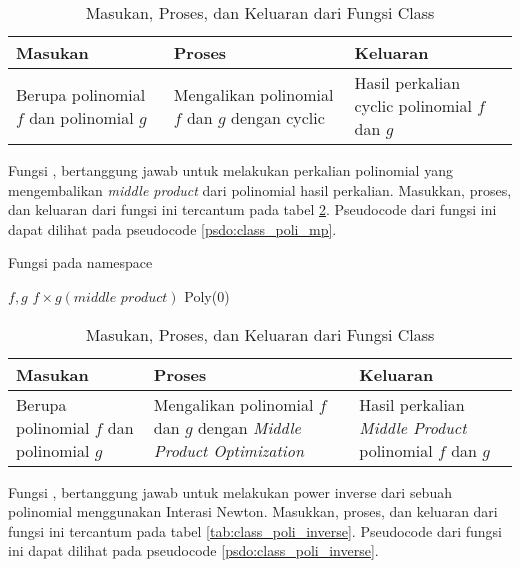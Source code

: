 \begin{table}[]	
	\Centering
	\begin{tabular}{|p{3cm}|p{3cm}|p{3cm}|}
	\hline
	Masukan & Proses & Keluaran \\ \hline
	Berupa polinomial $f$ dan polinomial $g$ & Mengalikan polinomial $f$ dan $g$ dengan cyclic & Hasil perkalian cyclic polinomial $f$ dan $g$\\ \hline
	\end{tabular}
	\caption{Masukan, Proses, dan Keluaran dari Fungsi  Class }
	\label{tab:class_poli_mul_cyclic}
\end{table}

\newpage

Fungsi , bertanggung jawab untuk melakukan perkalian polinomial yang mengembalikan \textit{middle product} dari polinomial hasil perkalian.  Masukkan, proses, dan keluaran dari fungsi ini tercantum pada tabel \ref{tab:class_poli_mp}. Pseudocode dari fungsi ini dapat dilihat pada pseudocode \ref{psdo:class_poli_mp}.

\begin{algorithm}
	\caption{Fungsi  pada namespace }
	\label{psdo:class_poli_mp}
	\begin{algorithmic}[1]
		\Require $ f, g $
		\Ensure $ f \times g (\textit{middle product})$
			\State \Return Poly(0)
		\EndIf
		\State {}
		\State \Return {}
	\end{algorithmic}
\end{algorithm}

\begin{table}[]	
	\Centering
	\begin{tabular}{|p{3cm}|p{3cm}|p{3cm}|}
	\hline
	Masukan & Proses & Keluaran \\ \hline
	Berupa polinomial $f$ dan polinomial $g$ & Mengalikan polinomial $f$ dan $g$ dengan \textit{Middle Product Optimization} & Hasil perkalian \textit{Middle Product} polinomial $f$ dan $g$\\ \hline
	\end{tabular}
	\caption{Masukan, Proses, dan Keluaran dari Fungsi  Class }
	\label{tab:class_poli_mp}
\end{table}

\newpage

Fungsi , bertanggung jawab untuk melakukan power inverse dari sebuah polinomial menggunakan Interasi Newton. Masukkan, proses, dan keluaran dari fungsi ini tercantum pada tabel \ref{tab:class_poli_inverse}. Pseudocode dari fungsi ini dapat dilihat pada pseudocode \ref{psdo:class_poli_inverse}.

